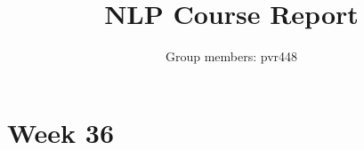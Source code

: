 \documentclass[11pt]{article}
\begin{document}
\nolinenumbers  %


\title{NLP Course Report}
\author{Group members: pvr448}

\maketitle

\section{Week 36}
\label{week36}
\end{document}

